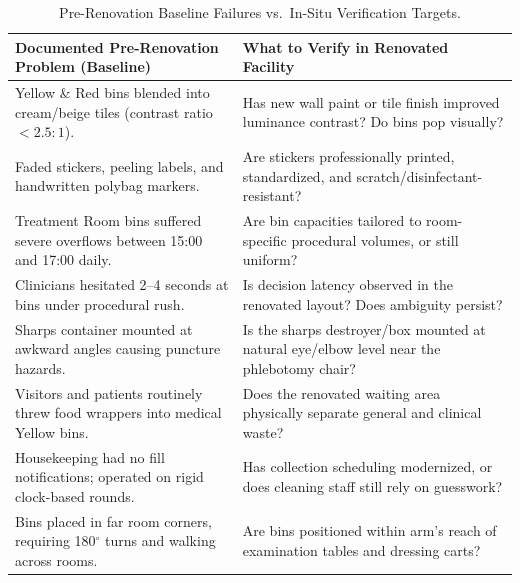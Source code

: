 \documentclass[11pt,a4paper]{article}
\begin{document}
\begin{table}[h!]
\centering
\small
\renewcommand{\arraystretch}{1.2}
\begin{tabularx}{\textwidth}{p{6.8cm}X}
\toprule
\rowcolor{iitblue}
\color{white}\textbf{Documented Pre-Renovation Problem (Baseline)} & \color{white}\textbf{What to Verify in Renovated Facility} \\
\midrule
Yellow \& Red bins blended into cream/beige tiles (contrast ratio $<2.5:1$). & Has new wall paint or tile finish improved luminance contrast? Do bins pop visually? \\
\rowcolor{softgray}
Faded stickers, peeling labels, and handwritten polybag markers. & Are stickers professionally printed, standardized, and scratch/disinfectant-resistant? \\
Treatment Room bins suffered severe overflows between 15:00 and 17:00 daily. & Are bin capacities tailored to room-specific procedural volumes, or still uniform? \\
\rowcolor{softgray}
Clinicians hesitated 2--4 seconds at bins under procedural rush. & Is decision latency observed in the renovated layout? Does ambiguity persist? \\
Sharps container mounted at awkward angles causing puncture hazards. & Is the sharps destroyer/box mounted at natural eye/elbow level near the phlebotomy chair? \\
\rowcolor{softgray}
Visitors and patients routinely threw food wrappers into medical Yellow bins. & Does the renovated waiting area physically separate general and clinical waste? \\
Housekeeping had no fill notifications; operated on rigid clock-based rounds. & Has collection scheduling modernized, or does cleaning staff still rely on guesswork? \\
\rowcolor{softgray}
Bins placed in far room corners, requiring 180$^\circ$ turns and walking across rooms. & Are bins positioned within arm's reach of examination tables and dressing carts? \\
\bottomrule
\end{tabularx}
\caption{Pre-Renovation Baseline Failures vs.\ In-Situ Verification Targets.}
\end{table}
\end{document}
